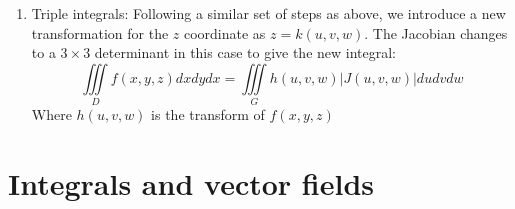 \documentclass[a4paper]{article}
\begin{document}
\begin{itemize}
\begin{enumerate}
        \item Triple integrals: Following a similar set of steps as above, we introduce a new transformation for the $z$ coordinate as $z=k(u,v,w)$. The Jacobian changes to a $3\times3$ determinant in this case to give the new integral:
        \begin{equation*}
            \iiint\limits_Df(x,y,z)dxdydx = \iiint\limits_G h(u,v,w)|J(u,v,w)|dudvdw
        \end{equation*}
        Where $h(u,v,w)$ is the transform of $f(x,y,z)$
    \end{enumerate}
\end{itemize}

\section{Integrals and vector fields}
\end{document}
